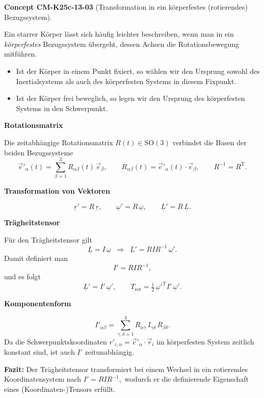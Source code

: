 \documentclass[10pt, letterpaper]{article}
\newcommand{\CustomHeading}[3]{%
  \par\medskip\noindent%
  \textbf{#1 #2} \textnormal{(#3)}.\enskip%
}
\newenvironment{CONC}[2]{\CustomHeading{Concept}{#1}{#2}}{}
\begin{document}
\begin{CONC}{CM-K25c-13-03}{Transformation in ein körperfestes (rotierendes) Bezugssystem}
Ein starrer Körper lässt sich häufig leichter beschreiben, wenn man in
ein \emph{körperfestes} Bezugssystem übergeht, dessen Achsen die
Rotationsbewegung mitführen.  

\begin{itemize}
  \item Ist der Körper in einem Punkt fixiert, so wählen wir den Ursprung
        sowohl des Inertialsystems als auch des körperfesten Systems in
        diesem Fixpunkt.

  \item Ist der Körper frei beweglich, so legen wir den Ursprung des
        körperfesten Systems in den Schwerpunkt.
\end{itemize}

\vspace{0.5em}

\textbf{Rotationsmatrix}

Die zeitabhängige Rotationsmatrix $R(t)\in\mathrm{SO}(3)$ verbindet die
Basen der beiden Bezugssysteme
\[
  \vec e'_\alpha(t)=\sum_{\beta=1}^{3}R_{\alpha\beta}(t)\,\vec e_\beta,
  \qquad
  R_{\alpha\beta}(t)=\vec e'_\alpha(t)\!\cdot\!\vec e_\beta,
  \qquad
  R^{-1}=R^{\mathrm T}.
\]

\textbf{Transformation von Vektoren}

\[
  \underline r' = R\,\underline r,
  \qquad
  \underline\omega' = R\,\underline\omega,
  \qquad
  \underline L' = R\,\underline L.
\]

\textbf{Trägheitstensor}

Für den Trägheitstensor gilt
\[
  \underline L = I\,\underline\omega
  \;\;\Longrightarrow\;\;
  \underline L' = RIR^{-1}\,\underline\omega'.
\]
Damit definiert man
\[
  I' = R I R^{-1},
\]
und es folgt
\[
  \underline L' = I'\,\underline\omega', 
  \qquad
  T_{\text{rot}} = \tfrac12\,\underline\omega'^{\!\mathrm T}
                   I'\,\underline\omega'.
\]

\textbf{Komponentenform}

\[
  I'_{\alpha\beta}
  =\sum_{\gamma,\delta=1}^{3}
     R_{\alpha\gamma}\,I_{\gamma\delta}\,R_{\beta\delta}.
\]
Da die Schwerpunktskoordinaten $r'_{i,\alpha}
=\vec e'_\alpha\!\cdot\!\vec r_i$ im körperfesten System zeitlich
konstant sind, ist auch $I'$ zeitunabhängig.

\vspace{0.5em}

\noindent
\textbf{Fazit:}  
Der Trägheitstensor transformiert bei einem Wechsel in ein rotierendes
Koordinatensystem nach
\(
  I'\!=\!RIR^{-1},
\)
wodurch er die definierende Eigenschaft eines (Koordinaten-)Tensors
erfüllt.
\end{CONC}
\end{document}
